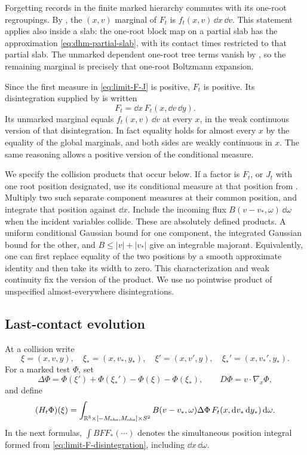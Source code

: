 Forgetting records in the finite marked hierarchy commutes with its
one-root regroupings.  By
,
the \((x,v)\) marginal of \(F_t\) is \(f_t(x,v)\,\dd x\,\dd v\).
This statement applies also inside a slab: the one-root block map on a
partial slab has the approximation \eqref{eq:dhm-partial-slab}, with
its contact times restricted to that partial slab.  The unmarked dependent
one-root tree terms vanish by , so
the remaining marginal is precisely that one-root Boltzmann expansion.

Since the first measure in \eqref{eq:limit-F-J} is positive, \(F_t\)
is positive.  Its disintegration supplied by
 is written
\begin{equation}\label{eq:limit-F-disintegration}
                         F_t=\dd x\,F_t(x,\dd v\,\dd y).
\end{equation}
Its unmarked marginal equals \(f_t(x,v)\,\dd v\) at every \(x\), in
the weak continuous version of that disintegration.  In fact equality
holds for almost every \(x\) by the equality of the global marginals,
and both sides are weakly continuous in \(x\).  The same reasoning
allows a positive version of the conditional measure.

We specify the collision products that occur below.  If a factor is
\(F_t\), or \(J_t\) with one root position designated, use its conditional
measure at that position from .
Multiply two such separate component measures at their common position,
and integrate that position against \(\dd x\).  Include the incoming
flux \(B(v-v_*,\omega)\,\dd\omega\) when the incident variables collide.
These are absolutely defined products.  A uniform conditional Gaussian
bound for one component, the integrated Gaussian bound for the other,
and \(B\le |v|+|v_*|\) give an integrable majorant.  Equivalently, one
can first replace equality of the two positions by a smooth approximate
identity and then take its width to zero.  This characterization and
weak continuity fix the version of the product.  We use no
pointwise product of unspecified almost-everywhere disintegrations.

\subsection{Last-contact evolution}

At a collision write
\[
 \xi=(x,v,y),\quad \xi_*=(x,v_*,y_*),\quad
 \xi'=(x,v',y),\quad \xi_*'=(x,v_*',y_*).
\]
For a marked test \(\Phi\), set
\[
 \Delta\Phi=\Phi(\xi')+\Phi(\xi_*')-\Phi(\xi)-\Phi(\xi_*),
 \qquad D\Phi=v\cdot\nabla_x\Phi,
\]
and define
\begin{equation}\label{eq:limit-marked-H}
 (H_t\Phi)(\xi)
   =\int_{\mathbb R^3\times[-M_{\mathrm{obs}},M_{\mathrm{obs}}]\times S^2}
       B(v-v_*,\omega)\Delta\Phi\,
          F_t(x,\mathrm d v_*\,\mathrm d y_*)\,\mathrm d\omega.
\end{equation}
In the next formulas, \(\int BFF_*(\cdots)\) denotes the simultaneous
position integral formed from \eqref{eq:limit-F-disintegration},
including \(\dd x\,\dd\omega\).

